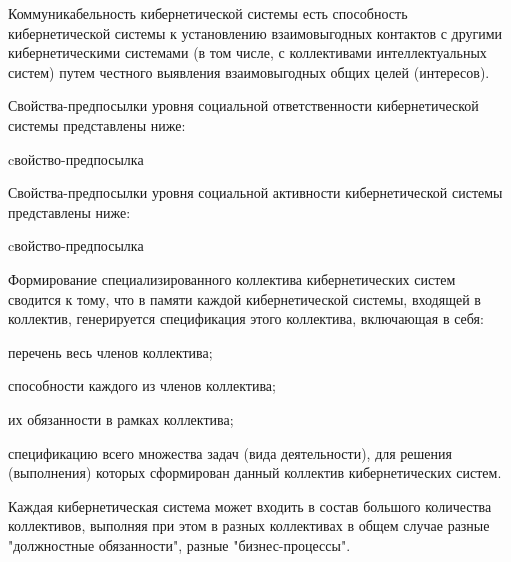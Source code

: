 Коммуникабельность кибернетической системы есть способность кибернетической системы к установлению взаимовыгодных контактов с другими кибернетическими системами (в том числе, с коллективами интеллектуальных систем) путем честного выявления взаимовыгодных общих целей (интересов).

Свойства-предпосылки уровня социальной ответственности кибернетической системы представлены ниже:

\begin{SCn}
\begin{scnrelfromlist}{cвойство-предпосылка}
\end{scnrelfromlist}
\end{SCn}

Свойства-предпосылки уровня социальной активности кибернетической системы представлены ниже:

\begin{SCn}
\begin{scnrelfromlist}{cвойство-предпосылка}
\end{scnrelfromlist}
\end{SCn}

Формирование специализированного коллектива кибернетических систем сводится к тому, что в памяти каждой кибернетической системы, входящей в коллектив, генерируется спецификация этого коллектива, включающая в себя:
\begin{textitemize}
    \item перечень весь членов коллектива;
    \item способности каждого из членов коллектива;
    \item их обязанности в рамках коллектива;
    \item спецификацию всего множества задач (вида деятельности), для решения (выполнения) которых сформирован данный коллектив кибернетических систем.
\end{textitemize}

Каждая кибернетическая система может входить в состав большого количества коллективов, выполняя при этом в разных коллективах в общем случае разные "должностные обязанности"{}, разные "бизнес-процессы"{}.
